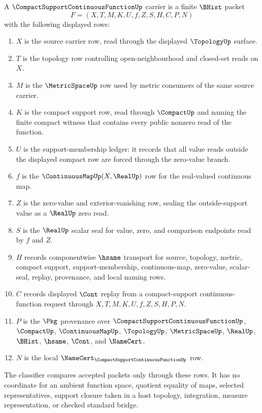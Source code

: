 \begin{definition}
\label{def:compact-support-continuous-function-carrier}
A $\CompactSupportContinuousFunctionUp$ carrier is a finite $\BHist$ packet
$$
F=(X,T,M,K,U,f,Z,S,H,C,P,N)
$$
with the following displayed rows:
\begin{enumerate}
\item $X$ is the source carrier row, read through the displayed $\TopologyUp$ surface.
\item $T$ is the topology row controlling open-neighbourhood and closed-set reads on $X$.
\item $M$ is the $\MetricSpaceUp$ row used by metric consumers of the same source carrier.
\item $K$ is the compact support row, read through $\CompactUp$ and naming the finite compact witness that contains every public nonzero read of the function.
\item $U$ is the support-membership ledger: it records that all value reads outside the displayed compact row are forced through the zero-value branch.
\item $f$ is the $\ContinuousMapUp(X,\RealUp)$ row for the real-valued continuous map.
\item $Z$ is the zero-value and exterior-vanishing row, sealing the outside-support value as a $\RealUp$ zero read.
\item $S$ is the $\RealUp$ scalar seal for value, zero, and comparison endpoints read by $f$ and $Z$.
\item $H$ records componentwise $\hsame$ transport for source, topology, metric, compact support, support-membership, continuous-map, zero-value, scalar-seal, replay, provenance, and local naming rows.
\item $C$ records displayed $\Cont$ replay from a compact-support continuous-function request through $X,T,M,K,U,f,Z,S,H,P,N$.
\item $P$ is the $\Pkg$ provenance over $\CompactSupportContinuousFunctionUp$, $\CompactUp$, $\ContinuousMapUp$, $\TopologyUp$, $\MetricSpaceUp$, $\RealUp$, $\BHist$, $\hsame$, $\Cont$, and $\NameCert$.
\item $N$ is the local $\NameCert_{\CompactSupportContinuousFunctionUp}$ row.
\end{enumerate}
The classifier compares accepted packets only through these rows. It has no coordinate for an ambient function space, quotient equality of maps, selected representatives, support closure taken in a host topology, integration, measure representation, or checked standard bridge.
\end{definition}

